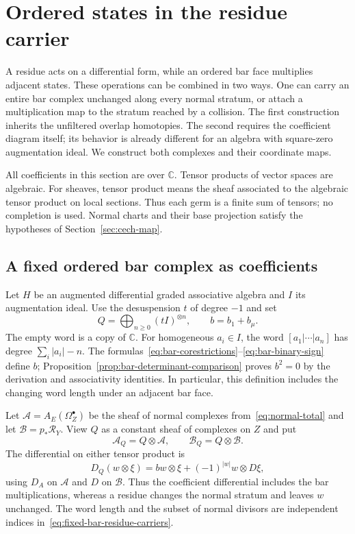 \section{Ordered states in the residue carrier}
\label{sec:ordered-residue-coefficients}

A residue acts on a differential form, while an ordered bar face multiplies adjacent states.
These operations can be combined in two ways.
One can carry an entire bar complex unchanged along every normal stratum, or attach a multiplication map to the stratum reached by a collision.
The first construction inherits the unfiltered overlap homotopies.
The second requires the coefficient diagram itself; its behavior is already different for an algebra with square-zero augmentation ideal.
We construct both complexes and their coordinate maps.

All coefficients in this section are over $\mathbb C$.
Tensor products of vector spaces are algebraic.
For sheaves, tensor product means the sheaf associated to the algebraic tensor product on local sections.
Thus each germ is a finite sum of tensors; no completion is used.
Normal charts and their base projection satisfy the hypotheses of Section~\ref{sec:cech-map}.

\subsection{A fixed ordered bar complex as coefficients}
\label{subsec:fixed-bar-coefficients}

Let $H$ be an augmented differential graded associative algebra and $I$ its augmentation ideal.
Use the desuspension $t$ of degree $-1$ and set
\[
Q=\bigoplus_{n\geq0}(tI)^{\otimes n},\qquad b=b_1+b_\mu.
\]
The empty word is a copy of $\mathbb C$.
For homogeneous $a_i\in I$, the word $[a_1|\cdots|a_n]$ has degree
$\sum_i|a_i|-n$.
The formulas~\eqref{eq:bar-corestrictions}--\eqref{eq:bar-binary-sign} define $b$;
Proposition~\ref{prop:bar-determinant-comparison} proves $b^2=0$ by the derivation and associativity identities.
In particular, this definition includes the changing word length under an adjacent bar face.

Let $\mathcal A=A_E(\Omega_Z^\bullet)$ be the sheaf of normal complexes from~\eqref{eq:normal-total} and let
$\mathcal B=p_*\mathcal R_Y$.
View $Q$ as a constant sheaf of complexes on $Z$ and put
\begin{equation}
\label{eq:fixed-bar-residue-carriers}
\mathcal A_Q=Q\otimes\mathcal A,\qquad
\mathcal B_Q=Q\otimes\mathcal B.
\end{equation}
The differential on either tensor product is
\begin{equation}
\label{eq:fixed-bar-total-differential}
D_Q(w\otimes\xi)=bw\otimes\xi+(-1)^{|w|}w\otimes D\xi,
\end{equation}
using $D_A$ on $\mathcal A$ and $D$ on $\mathcal B$.
Thus the coefficient differential includes the bar multiplications, whereas a residue changes the normal stratum and leaves $w$ unchanged.
The word length and the subset of normal divisors are independent indices in~\eqref{eq:fixed-bar-residue-carriers}.

